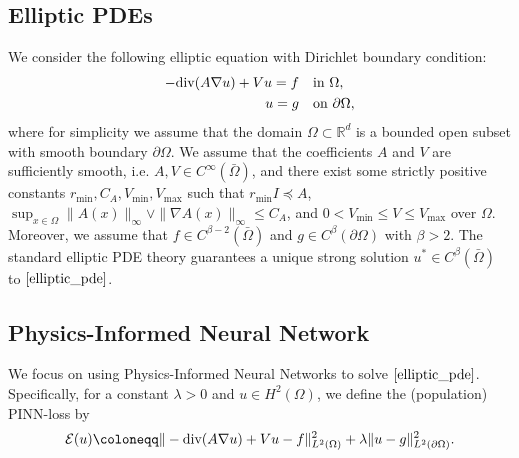 \documentclass{article}
\newcommand{\R}{\mathbb{R}}
\renewcommand{\div}{\textnormal{div}}
\theoremstyle{plain}
\theoremstyle{definition}
\theoremstyle{remark}
\begin{document}
\subsection{Elliptic PDEs} \label{pde_assumption}

We consider the following elliptic equation with Dirichlet boundary condition:
\begin{equation}\label{elliptic_pde}
\begin{aligned}
    - \div (A \nabla u) + V u = f  \quad & \textnormal{in} \ \Omega, \\
    u = g \quad & \textnormal{on} \ \partial \Omega, 
\end{aligned}
\end{equation}
where for simplicity we assume 
that the domain $\Omega \subset \R^d$ is a bounded open subset  with smooth boundary $\partial \Omega$. We assume that the coefficients $A$ and $V$ are sufficiently smooth, i.e. $A, V \in C^\infty(\bar{\Omega})$, and there exist some strictly positive constants $r_{\text{min}}, C_A, V_{\text{min}}, V_{\text{max}}$ such that $ r_{\text{min}} I \preceq A $, $\sup_{x \in \Omega}\|A(x)\|_{\infty} \vee \|\nabla A(x)\|_{\infty} \leq C_A$, and $0 < V_{\text{min}} \leq V \leq V_{\text{max}}$ over $\Omega$. 
Moreover, we assume that $f \in C^{\beta-2}(\bar{\Omega})$ and $g \in C^{\beta}(\partial{\Omega})$ with $\beta > 2$.
 The standard elliptic PDE theory \cite{grisvard2011elliptic} guarantees a unique strong solution $u^* \in C^{\beta}(\bar{\Omega})$ to $\eqref{elliptic_pde}$. 

\subsection{Physics-Informed Neural Network}

We focus on using Physics-Informed Neural Networks to solve $\eqref{elliptic_pde}$. Specifically, for a  constant $\lambda > 0$ and $u \in H^2(\Omega)$, we define the (population) PINN-loss by 
\begin{equation}
    \label{cont_pinn_loss}
    \mathcal{E}(u) \coloneqq \|-\div(A \nabla u) + V u - f\|_{L^2(\Omega)}^2 + \lambda 
    \|u - g\|_{L^2(\partial \Omega)}^2. 
\end{equation} 
\end{document}
